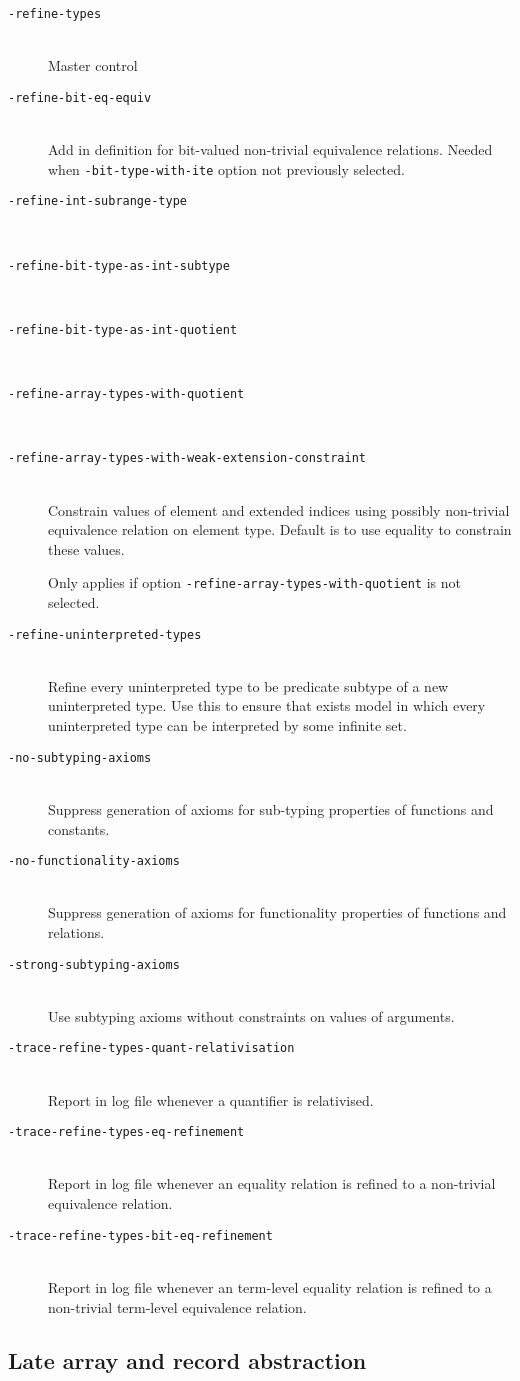 \documentclass[12pt,fleqn]{article}
\newcommand{\optionb}[1]{\item[\texttt{-{#1}}]\ \\}
\begin{document}
\begin{description}
\optionb{refine-types} Master control

\optionb{refine-bit-eq-equiv} 
  Add in definition for bit-valued non-trivial equivalence relations.
  Needed when \texttt{-bit-type-with-ite} option not previously selected.

\optionb{refine-int-subrange-type}       
\optionb{refine-bit-type-as-int-subtype}
\optionb{refine-bit-type-as-int-quotient}
\optionb{refine-array-types-with-quotient}

\optionb{refine-array-types-with-weak-extension-constraint}
  Constrain values of element and extended indices using possibly non-trivial
  equivalence relation on element type.  Default is to use equality to
  constrain these values.

  Only applies if option \texttt{-refine-array-types-with-quotient} is not
  selected.

\optionb{refine-uninterpreted-types}
  Refine every uninterpreted type to be predicate subtype of a new 
  uninterpreted type.  Use this to ensure that exists model in which 
  every uninterpreted type can be interpreted by some infinite set.

\optionb{no-subtyping-axioms}
  Suppress generation of axioms for sub-typing properties of functions and
  constants.

\optionb{no-functionality-axioms}
  Suppress generation of axioms for functionality properties of functions and
  relations.

\optionb{strong-subtyping-axioms}
  Use subtyping axioms without constraints on values of arguments.

\optionb{trace-refine-types-quant-relativisation}
  Report in log file whenever a quantifier is relativised.

\optionb{trace-refine-types-eq-refinement}
  Report in log file whenever an equality relation is refined to a non-trivial
  equivalence relation.

\optionb{trace-refine-types-bit-eq-refinement}
  Report in log file whenever an term-level equality relation is refined to 
  a non-trivial term-level equivalence relation.
\end{description}

\subsection{Late array and record abstraction}
\label{sec:late-arr-rec-abs}
\end{document}
